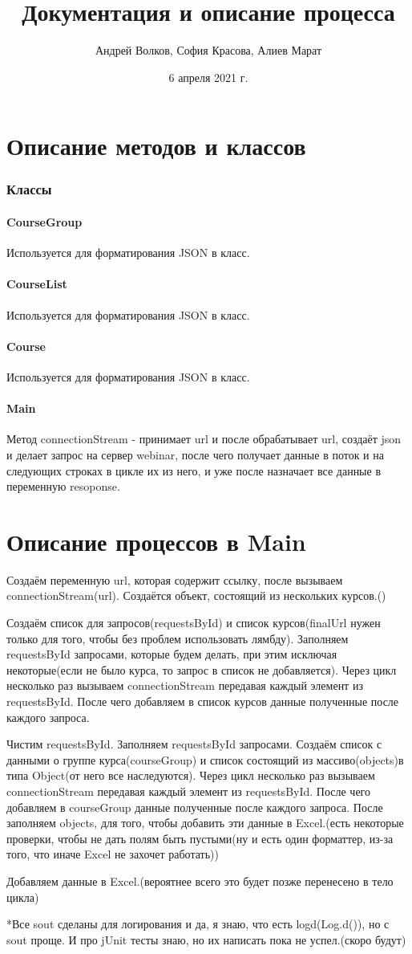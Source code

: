 \documentclass[a4paper, 12pt]{article}
\author{Андрей Волков, София Красова, Алиев Марат}
\title{Документация и описание процесса}
\date{6 апреля 2021 г.}
\begin{document}
	\maketitle
	\part*{Описание методов и классов}
	\section{Классы}
	\subsection{CourseGroup}
	Используется для форматирования JSON в класс.
	\subsection{CourseList}
	Используется для форматирования JSON в класс.
	\subsection{Course}
	Используется для форматирования JSON в класс.
	\subsection{Main}
	Метод connectionStream - принимает url и после обрабатывает url, создаёт json и делает запрос на сервер webinar, после чего получает данные в поток и на следующих строках в цикле их из него, и уже после назначает все данные в переменную resoponse.
	
	\part*{Описание процессов в Main}
	Создаём переменную url, которая содержит ссылку, после вызываем connectionStream(url). Создаётся объект, состоящий из нескольких курсов.()
	
	Создаём список для запросов(requestsById) и список курсов(finalUrl нужен только для того, чтобы без проблем использовать лямбду). Заполняем requestsById запросами, которые будем делать, при этим исключая некоторые(если не было курса, то запрос в список не добавляется). Через цикл несколько раз вызываем connectionStream передавая каждый элемент из requestsById. После чего добавляем в список курсов данные полученные после каждого запроса.
	
	Чистим requestsById. Заполняем requestsById запросами. Создаём список с данными о группе курса(courseGroup) и список состоящий из массиво(objects)в типа Object(от него все наследуются). Через цикл несколько раз вызываем connectionStream передавая каждый элемент из requestsById. После чего добавляем в courseGroup данные полученные после каждого запроса. После заполняем objects, для того, чтобы добавить эти данные в Excel.(есть некоторые проверки, чтобы не дать полям быть пустыми(ну и есть один форматтер, из-за того, что иначе Excel не захочет работать))
	
	Добавляем данные в Excel.(вероятнее всего это будет позже перенесено в тело цикла)
	
	*Все sout сделаны для логирования и да, я знаю, что есть logd(Log.d()), но с sout проще. И про jUnit тесты знаю, но их написать пока не успел.(скоро будут)
\end{document}
